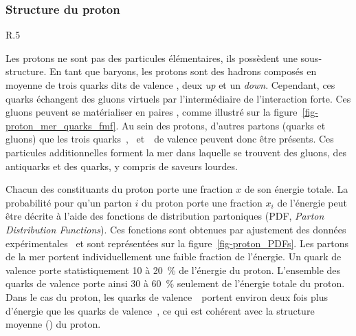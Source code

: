 \subsubsection{Structure du proton}
\begin{wrapfigure}{R}{.5\textwidth}
\centering
\vspace{1.2\baselineskip}

\vspace{1.2\baselineskip}
\caption{Diagramme de Feynman de la propagation d'un proton avec apparition d'une paire \quark\antiquark.}
\label{fig-proton_mer_quarks_fmf}
\end{wrapfigure}
Les protons ne sont pas des particules élémentaires, ils possèdent une sous-structure.
En tant que baryons, les protons sont des hadrons composés en moyenne de trois quarks dits \og de valence \fg{}, deux \emph{up} et un \emph{down}.
Cependant, ces quarks échangent des gluons virtuels par l'intermédiaire de l'interaction forte.
Ces gluons peuvent se matérialiser en paires \quark\antiquark, comme illustré sur la figure~\ref{fig-proton_mer_quarks_fmf}.
Au sein des protons, d'autres partons (quarks et gluons) que les trois quarks~\quarku, \quarku\ et~\quarkd\ de valence peuvent donc être présents.
Ces particules additionnelles forment la \og mer \fg{} dans laquelle se trouvent des gluons, des antiquarks et des quarks, y compris de saveurs lourdes.
\par Chacun des constituants du proton porte une fraction $x$ de son énergie totale.
La probabilité pour qu'un parton $i$ du proton porte une fraction $x_i$ de l'énergie peut être décrite à l'aide des fonctions de distribution partoniques (PDF, \emph{Parton Distribution Functions}).
Ces fonctions sont obtenues par ajustement des données expérimentales~\cite{Gao_2018,Ball_2015} et sont représentées sur la figure~\ref{fig-proton_PDFs}.
Les partons de la mer portent individuellement une faible fraction de l'énergie.
Un quark de valence porte statistiquement \num{10} à \SI{20}{\%} de l'énergie du proton.
L'ensemble des quarks de valence porte ainsi \num{30} à \SI{60}{\%} seulement de l'énergie totale du proton.
Dans le cas du proton, les quarks de valence~\quarku\ portent environ deux fois plus d'énergie que les quarks de valence~\quarkd, ce qui est cohérent avec la structure moyenne (\quarku\quarku\quarkd) du proton.
